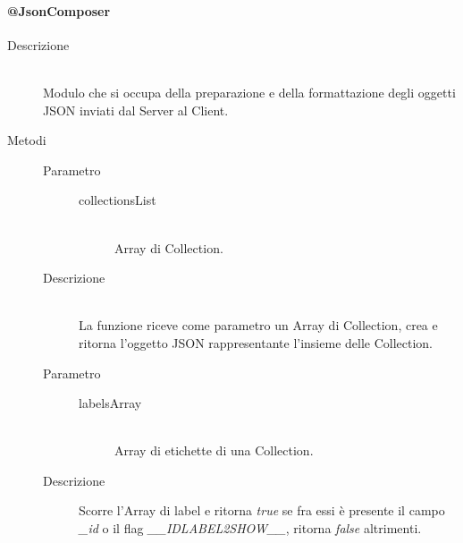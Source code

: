 \paragraph{@JsonComposer}
\begin{description}
 \item[Descrizione] \hfill \\
 Modulo che si occupa della preparazione e della formattazione degli oggetti JSON inviati dal Server al Client.
 
 \item[Metodi]
 \begin{mldescription}
   \hfill
   \begin{description}
    \item[Parametro] \hfill
     \begin{description}
      \item[collectionsList] \hfill \\
      Array di Collection.
     \end{description}
    \item[Descrizione] \hfill \\
    La funzione riceve come parametro un Array di Collection, crea e ritorna l'oggetto JSON rappresentante l'insieme delle Collection.
   \end{description}
  
   \hfill
   \begin{description}
    \item[Parametro] \hfill
     \begin{description}
      \item[labelsArray] \hfill \\
      Array di etichette di una Collection.
     \end{description}
    \item[Descrizione]
    Scorre l'Array di label e ritorna \textit{true} se fra essi è presente il campo \textit{\_id} o il flag \textit{\_\_IDLABEL2SHOW\_\_}, ritorna \textit{false} altrimenti.
   \end{description}
   

\end{mldescription}
\end{description}

